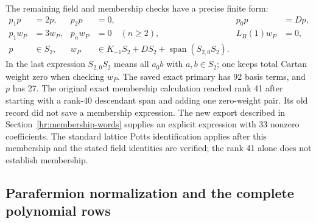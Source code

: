 The remaining field and membership checks have a precise finite form:
\begin{align*}
 p_1p&=2p,&p_2p&=0,&p_0p&=Dp,\\
 p_1w_P&=3w_P,&p_nw_P&=0\quad(n\geq2),&
 L_B(1)w_P&=0,\\
 p&\in S_2,&w_P&\in K_{-1}S_2+DS_2+\operatorname{span}(S_{2,0}S_2).
\end{align*}
In the last expression $S_{2,0}S_2$ means all $a_0b$ with
$a,b\in S_2$; one keeps total Cartan weight zero when checking $w_P$.
The saved exact primary has 92 basis terms, and $p$ has 27.
The original exact membership calculation reached rank 41 after
starting with a rank-40 descendant span and adding one zero-weight
pair. Its old record did not save a membership expression. The new
export described in Section~\ref{hr:membership-words} supplies an
explicit expression with 33 nonzero coefficients. The standard
lattice Potts identification applies after this membership and the
stated field identities are verified; the rank 41 alone does not
establish membership.

\subsection{Parafermion normalization and the complete polynomial rows}

